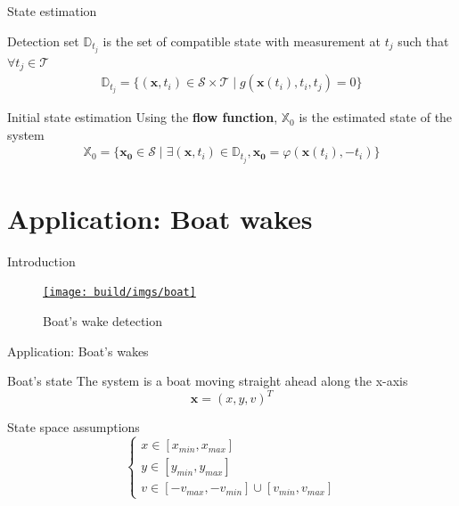 \documentclass{beamer}
\begin{document}
            \begin{frame}{State estimation}
                \begin{block}{Detection set}
                    $\mathbb{D}_{t_j}$ is the set of compatible state with measurement at $t_j$ such that $\forall t_j \in \mathcal{T}$
                    \begin{eqnarray}
                        \mathbb{D}_{t_j} = \{ (\mathbf{x}, t_i) \in \mathcal{S} \times \mathcal{T} \mid g(\mathbf{x}(t_i), t_i, t_j) = 0\}
                    \end{eqnarray}
                \end{block}

                \begin{block}{Initial state estimation}
                    Using the \textbf{flow function}, $\mathbb{X}_0$ is the estimated state of the system
                    \begin{eqnarray}
                        \mathbb{X}_0 = \{ \mathbf{x_0} \in \mathcal{S} \mid \exists (\mathbf{x}, t_i) \in \mathbb{D}_{t_j}, \mathbf{x_0} = \varphi(\mathbf{x}(t_i), -t_i) \}
                    \end{eqnarray}
                \end{block}
            \end{frame}
    
    \section{Application: Boat wakes}

            \begin{frame}{Introduction}
                \begin{figure}
                    \centering
                    \href{run:boat.mp4?autostart&loop}{\texttt{[image: build/imgs/boat]}}
                    \caption{Boat's wake detection}
                \end{figure}
            \end{frame}

            \begin{frame}{Application: Boat's wakes}
                \begin{block}{Boat's state}
                    The system is a boat moving straight ahead along the x-axis
                    $$\mathbf{x} = (x, y, v)^T$$ 
                \end{block}
                \begin{block}{State space assumptions}
                    \begin{equation}
                    \begin{cases}x \in [x_{min}, x_{max}] \\ y \in [y_{min}, y_{max}] \\ v \in [-v_{max}, -v_{min}] \cup [v_{min}, v_{max}] \end{cases}
                    \end{equation}
                \end{block}
            \end{frame}
\end{document}
